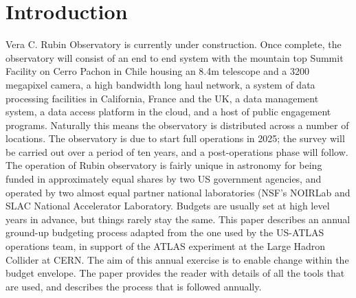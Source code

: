 \section{Introduction} \label{sec:intro}
Vera C. Rubin Observatory\cite{2008arXiv0805.2366I} is currently under construction. 
Once complete, the observatory will consist of an end to end system with the mountain top Summit Facility on Cerro Pachon in Chile housing an 8.4m telescope and a 3200 megapixel camera, a high bandwidth long haul network, a system of data processing facilities in California, France and the UK, a data management system, a data access platform in the cloud, and a host of public engagement programs. 
Naturally this means the observatory is distributed across a number of locations. 
The observatory is due to start full operations in 2025; the survey will be carried out over a period of ten years, and a post-operations phase will follow. 
The operation of Rubin observatory is fairly unique in astronomy for being funded in approximately equal shares by two US government agencies, and operated by two almost equal partner national laboratories (NSF's NOIRLab and SLAC National Accelerator Laboratory. 
Budgets are usually set at high level years in advance, but things rarely stay the same.
This paper describes an annual ground-up budgeting process adapted from the one used by the US-ATLAS operations team, in support of the ATLAS experiment at the Large Hadron Collider at CERN. 
The aim of this annual exercise is to enable change within the budget envelope.
The paper provides the reader with details of all the tools that are used, and describes the process that is followed annually.

